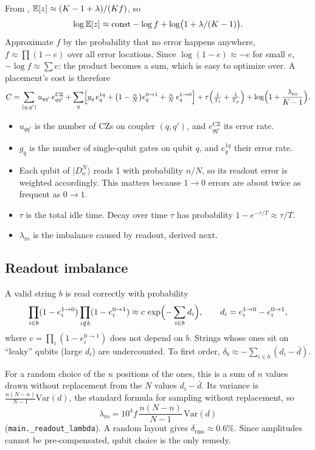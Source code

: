 \documentclass[11pt]{scrartcl}
\newcommand{\ket}[1]{\lvert #1\rangle}
\newcommand{\D}[2]{D^{#1}_{#2}}
\newcommand{\CZ}{\ensuremath{\mathrm{CZ}}}
\newcommand{\file}[1]{\texttt{\small #1}}
\begin{document}
From , $\mathbb E[z]\approx(K-1+\lambda)/(Kf)$, so
\[
  \log\mathbb E[z]\approx\mathrm{const}-\log f+\log\bigl(1+\lambda/(K-1)\bigr).
\]
Approximate $f$ by the probability that no error happens anywhere, $f\approx\prod(1-e)$ over all
error locations. Since $\log(1-e)\approx-e$ for small $e$, $-\log f\approx\sum e$: the product
becomes a sum, which is easy to optimize over. A placement's cost is therefore
\[
  C=\sum_{(q,q')}u_{qq'}\,e^{\CZ}_{qq'}+\sum_q\Bigl[g_q\,e^{1q}_q+\bigl(1-\tfrac nN\bigr)e^{0\to1}_q+\tfrac nN\,e^{1\to0}_q\Bigr]
  +\tau\Bigl(\tfrac1{T_1}+\tfrac1{T_\varphi}\Bigr)+\log\Bigl(1+\frac{\lambda_{\mathrm{ro}}}{K-1}\Bigr).
\]
\begin{itemize}
  \item $u_{qq'}$ is the number of \CZ{}s on coupler $(q,q')$, and $e^{\CZ}_{qq'}$ its error rate.
  \item $g_q$ is the number of single-qubit gates on qubit $q$, and $e^{1q}_q$ their error rate.
  \item Each qubit of $\ket{\D Nn}$ reads 1 with probability $n/N$, so its readout error is weighted
        accordingly. This matters because $1\to0$ errors are about twice as frequent as $0\to1$.
  \item $\tau$ is the total idle time. Decay over time $\tau$ has probability
        $1-e^{-\tau/T}\approx\tau/T$.
  \item $\lambda_{\mathrm{ro}}$ is the imbalance caused by readout, derived next.
\end{itemize}

\subsection{Readout imbalance}

A valid string $b$ is read correctly with probability
\[
  \prod_{i\in b}(1-e^{1\to0}_i)\prod_{i\notin b}(1-e^{0\to1}_i)\approx c\,\exp\Bigl(-\sum_{i\in b}d_i\Bigr),
  \qquad d_i=e^{1\to0}_i-e^{0\to1}_i,
\]
where $c=\prod_i(1-e^{0\to1}_i)$ does not depend on $b$. Strings whose ones sit on ``leaky'' qubits
(large $d_i$) are undercounted. To first order, $\delta_b\approx-\sum_{i\in b}(d_i-\bar d)$.

For a random choice of the $n$ positions of the ones, this is a sum of $n$ values drawn without
replacement from the $N$ values $d_i-\bar d$. Its variance is $\tfrac{n(N-n)}{N-1}\mathrm{Var}(d)$,
the standard formula for sampling without replacement, so
\[
  \lambda_{\mathrm{ro}}=10^4 f\,\frac{n(N-n)}{N-1}\,\mathrm{Var}(d)
\]
(\file{main.\_readout\_lambda}). A random layout gives $\delta_{\mathrm{rms}}\approx0.6\%$. Since
amplitudes cannot be pre-compensated, qubit choice is the only remedy.
\end{document}

